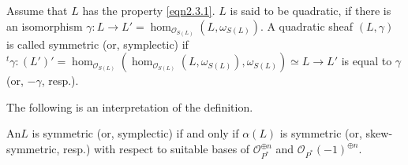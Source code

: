 \begin{dfn}\label{dfn2.11}
Assume that $L$ has the property \eqref{eqn2.3.1}. $L$ is said to be
quadratic, if there is an isomorphism $\gamma:L\to
L'=\hom_{\mathscr{O}_{S(L)}}(L,\omega_{S(L)})$. A quadratic sheaf
$(L,\gamma)$ is called symmetric (or, symplectic) if ${}^t\gamma:
(L')'=\hom_{\mathscr{O}_{S(L)}} (\hom_{\mathscr{O}_{S(L)}}(L,\omega_{S(L)}),\omega_{S(L)})\simeq
L\to L'$ is equal to $\gamma$ (or, $-\gamma$, resp.).

The following is an interpretation of the definition.
\end{dfn}

\begin{Prop}\label{Prop2.12}
An\pageoriginale $L$ is symmetric (or, symplectic) if and only if $\alpha(L)$ is
symmetric (or, skew-symmetric, resp.) with respect to suitable bases
of $\mathscr{O}_{P^{\ast}}^{\oplus n}$ and
$\mathscr{O}_{P^{\ast}}(-1)^{\oplus n}$.
\end{Prop}

